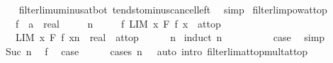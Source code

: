 \begin{isabellebody}
\ \ \isamarkupfalse%
\ filterlim{\isacharunderscore}{\kern0pt}uminus{\isacharunderscore}{\kern0pt}at{\isacharunderscore}{\kern0pt}bot\ tendsto{\isacharunderscore}{\kern0pt}minus{\isacharunderscore}{\kern0pt}cancel{\isacharunderscore}{\kern0pt}left\ \isamarkupfalse%
\ simp%
\endisatagproof
{\isafoldproof}%
%
\isadelimproof
\isanewline
%
\endisadelimproof
\isanewline
{}\isamarkupfalse%
\ filterlim{\isacharunderscore}{\kern0pt}pow{\isacharunderscore}{\kern0pt}at{\isacharunderscore}{\kern0pt}top{\isacharcolon}{\kern0pt}\isanewline
\ \ \ f\ {\isacharcolon}{\kern0pt}{\isacharcolon}{\kern0pt}\ {\isachardoublequoteopen}{\isacharprime}{\kern0pt}a\ {\isasymRightarrow}\ real{\isachardoublequoteclose}\isanewline
\ \ \ {\isachardoublequoteopen}{}\ {\isacharless}{\kern0pt}\ n{\isachardoublequoteclose}\isanewline
\ \ \ \ \ f{\isacharcolon}{\kern0pt}\ {\isachardoublequoteopen}LIM\ x\ F{\isachardot}{\kern0pt}\ f\ x\ {\isacharcolon}{\kern0pt}{\isachargreater}{\kern0pt}\ at{\isacharunderscore}{\kern0pt}top{\isachardoublequoteclose}\isanewline
\ \ \ {\isachardoublequoteopen}LIM\ x\ F{\isachardot}{\kern0pt}\ {\isacharparenleft}{\kern0pt}f\ x{\isacharparenright}{\kern0pt}{\isacharcircum}{\kern0pt}n\ {\isacharcolon}{\kern0pt}{\isacharcolon}{\kern0pt}\ real\ {\isacharcolon}{\kern0pt}{\isachargreater}{\kern0pt}\ at{\isacharunderscore}{\kern0pt}top{\isachardoublequoteclose}\isanewline
%
\isadelimproof
\ \ %
\endisadelimproof
%
\isatagproof
{}\isamarkupfalse%
\ {\isacartoucheopen}{}\ {\isacharless}{\kern0pt}\ n{\isacartoucheclose}\isanewline
{}\isamarkupfalse%
\ {\isacharparenleft}{\kern0pt}induct\ n{\isacharparenright}{\kern0pt}\isanewline
\ \ \isamarkupfalse%
\ {}\isanewline
\ \ \isamarkupfalse%
\ \isamarkupfalse%
\ {\isacharquery}{\kern0pt}case\ \isamarkupfalse%
\ simp\isanewline
{}\isamarkupfalse%
\isanewline
\ \ \isamarkupfalse%
\ {\isacharparenleft}{\kern0pt}Suc\ n{\isacharparenright}{\kern0pt}\ \isamarkupfalse%
\ f\ \isamarkupfalse%
\ {\isacharquery}{\kern0pt}case\isanewline
\ \ \ \ \isamarkupfalse%
\ {\isacharparenleft}{\kern0pt}cases\ {\isachardoublequoteopen}n\ {\isacharequal}{\kern0pt}\ {}{\isachardoublequoteclose}{\isacharparenright}{\kern0pt}\ {\isacharparenleft}{\kern0pt}auto\ intro{\isacharbang}{\kern0pt}{\isacharcolon}{\kern0pt}\ filterlim{\isacharunderscore}{\kern0pt}at{\isacharunderscore}{\kern0pt}top{\isacharunderscore}{\kern0pt}mult{\isacharunderscore}{\kern0pt}at{\isacharunderscore}{\kern0pt}top{\isacharparenright}{\kern0pt}\isanewline

\end{isabellebody}
